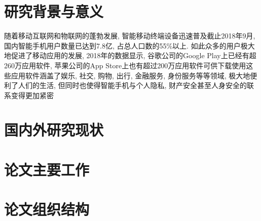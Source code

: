 \section{研究背景与意义}
随着移动互联网和物联网的蓬勃发展, 智能移动终端设备迅速普及\juhao 截止2018年9月,国内智能手机用户数量已达到7.8亿, 占总人口数的55\%以上. 如此众多的用户极大地促进了移动应用的发展, 2018年的数据显示, 谷歌公司的Google Play上已经有超260万应用软件, 苹果公司的App Store上也有超过200万应用软件可供下载使用\juhao 这些应用软件涵盖了娱乐, 社交, 购物, 出行, 金融服务, 身份服务等等领域, 极大地便利了人们的生活, 但同时也使得智能手机与个人隐私, 财产安全甚至人身安全的联系变得更加紧密\juhao 



\section{国内外研究现状}

\section{论文主要工作}

\section{论文组织结构}

 